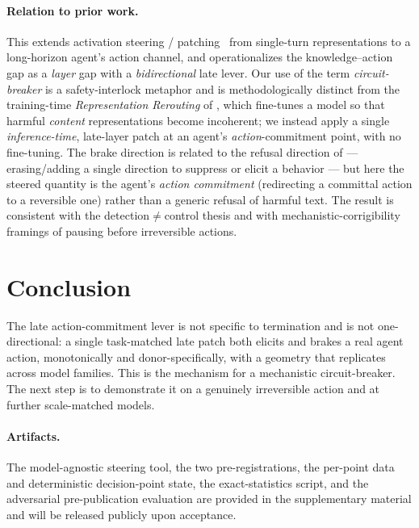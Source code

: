\documentclass[11pt]{article}
\begin{document}
\paragraph{Relation to prior work.} This extends activation steering / patching~\cite{actadd,repe} from
single-turn representations to a long-horizon agent's action channel, and operationalizes the knowledge--action
gap as a \emph{layer} gap with a \emph{bidirectional} late lever. Our use of the term \emph{circuit-breaker}
is a safety-interlock metaphor and is methodologically distinct from the training-time
\emph{Representation Rerouting} of \citet{circuitbreakers}, which fine-tunes a model so that harmful
\emph{content} representations become incoherent; we instead apply a single \emph{inference-time}, late-layer
patch at an agent's \emph{action}-commitment point, with no fine-tuning. The brake direction is related to the
refusal direction of \citet{refusaldir} --- erasing/adding a single direction to suppress or elicit a behavior
--- but here the steered quantity is the agent's \emph{action commitment} (redirecting a committal action to a
reversible one) rather than a generic refusal of harmful text. The result is consistent with the
detection$\neq$control thesis and with mechanistic-corrigibility framings of pausing before irreversible
actions.

\section{Conclusion}
The late action-commitment lever is not specific to termination and is not one-directional: a single
task-matched late patch both elicits and brakes a real agent action, monotonically and donor-specifically, with
a geometry that replicates across model families. This is the mechanism for a mechanistic circuit-breaker. The
next step is to demonstrate it on a genuinely irreversible action and at further scale-matched models.

\paragraph{Artifacts.} The model-agnostic steering tool, the two pre-registrations, the per-point data and
deterministic decision-point state, the exact-statistics script, and the adversarial pre-publication
evaluation are provided in the supplementary material and will be released publicly upon acceptance.
\end{document}
